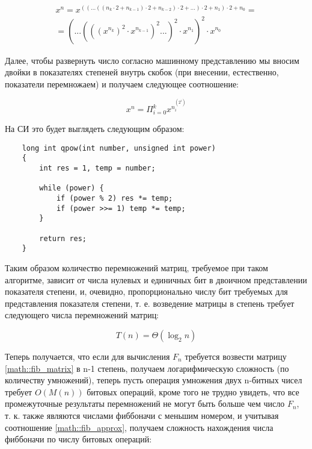 \begin{multline}
	x^n = x ^{
		\left (
			\left (
				...
				\left (
					\left ( 
						n_k \cdot 2 + n_{k-1}
					\right )
					\cdot 2 + n_{k-2}
				\right )
				\cdot 2 + ...
			\right )
			\cdot 2 + n_1
		\right )
		\cdot 2 + n_0 } = \\ =
		{\left (
			...
			{\left (
				{\left (
					{\left (
						x^{n_k}
					\right )
					}^2 \cdot x^{n_{k-1}}
				\right )
				}^2 ...
			\right )
			}^2 \cdot x^{n_1}
		\right )
		}^2 \cdot x^{n_0}
\end{multline}

Далее, чтобы развернуть число согласно машинному представлению мы вносим двойки в показателях степеней внутрь скобок (при внесении, естественно, показатели перемножаем) и получаем следующее соотношение:

\begin{equation}
	x^n = \Pi ^{k} _{i=0} x^{n_i^{(2^{i})}}
\end{equation}

На СИ это будет выглядеть следующим образом:

\begin{lstlisting}
	long int qpow(int number, unsigned int power)
	{
		int res = 1, temp = number;

		while (power) {
			if (power % 2) res *= temp;
			if (power >>= 1) temp *= temp;
		}

		return res;
	}
\end{lstlisting}

Таким образом количество перемножений матриц, требуемое при таком алгоритме, зависит от числа нулевых и единичных бит в двоичном представлении показателя степени, и, очевидно, пропорционально числу бит требуемых для представления показателя степени, т. е. возведение матрицы в степень требует следующего числа перемножений матриц:

\begin{equation}
	T(n) = \Theta ( \log _2 n )
\end{equation}

Теперь получается, что если для вычисления $F_n$ требуется возвести матрицу \ref{math::fib_matrix} в n-1 степень, получаем логарифмическую сложность (по количеству умножений), теперь пусть операция умножения двух n-битных чисел требует $O (M(n))$ битовых операций, кроме того не трудно увидеть, что все промежуточные результаты перемножений не могут быть больше чем число $F_n$, т. к. также являются числами фиббоначи с меньшим номером, и учитывая соотношение \ref{math::fib_approx}, получаем сложность нахождения числа фиббоначи по числу битовых операций:


